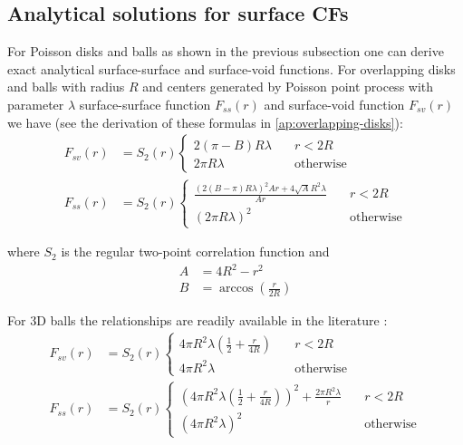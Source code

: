 \documentclass[reprint,amsmath,amssymb,aps,pre]{revtex4-1}
\begin{document}
\subsection{Analytical solutions for surface CFs}
For Poisson disks and balls as shown in the previous subsection one can derive
exact analytical surface-surface and surface-void functions. For overlapping
disks and balls with radius $R$ and centers generated by Poisson point process
with parameter $\lambda$ surface-surface function $F_{ss}(r)$ and surface-void
function $F_{sv}(r)$ we have (see the derivation of these formulas in
\cref{ap:overlapping-disks}):
\begin{align}
  F_{sv}(r) &= S_2(r) \left\{
  \begin{array}{ll}
    2(\pi - B)R \lambda & \quad r<2R \\
    2\pi R \lambda & \quad \text{otherwise}
  \end{array} \right. \label{eq:fsv_final} \\
  F_{ss}(r) &= S_2(r) \left\{
  \begin{array}{ll}
    \frac{(2(B-\pi)R\lambda)^2Ar + 4\sqrt{A}R^2\lambda}{Ar} & \quad r<2R \\
    (2\pi R\lambda)^2 & \quad \text{otherwise}
  \end{array} \right. \label{eq:fss_final}
\end{align}

where $S_2$ is the regular two-point correlation function and
\begin{align*}
  A &= 4R^2 - r^2 \\
  B &= \arccos(\frac{r}{2R})
\end{align*}

For 3D balls the relationships are readily available in the literature
\cite{Torq_book}\cite{Ma_Torq}:
\begin{align*}
  F_{sv}(r) &= S_2(r) \left\{
  \begin{array}{ll}
    4\pi R^2\lambda(\frac{1}{2} + \frac{r}{4R}) & \quad r<2R \\
    4\pi R^2\lambda & \quad \text{otherwise}
  \end{array} \right. \\
  F_{ss}(r) &= S_2(r) \left\{
  \begin{array}{ll}
    {(4\pi R^2 \lambda (\frac{1}{2} + \frac{r}{4R}))^2 + \frac{2\pi R^2 \lambda}{r}} & \quad r<2R \\
    (4\pi R^2 \lambda)^2 & \quad \text{otherwise}
  \end{array} \right.
\end{align*}
\end{document}
